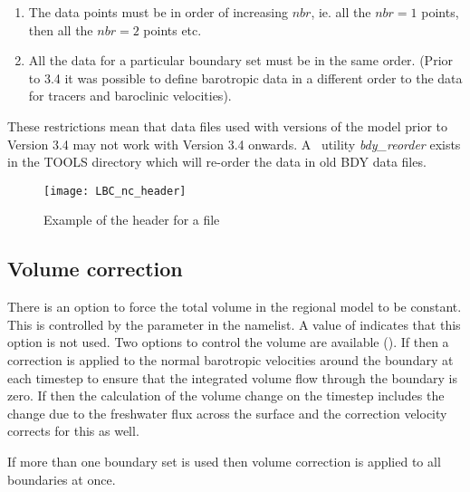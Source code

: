 \documentclass[../main/NEMO_manual]{subfiles}
\begin{document}
\begin{enumerate}
\item The data points must be in order of increasing $nbr$,
  ie. all the $nbr=1$ points, then all the $nbr=2$ points etc.
\item All the data for a particular boundary set must be in the same order.
  (Prior to 3.4 it was possible to define barotropic data in a different order to
  the data for tracers and baroclinic velocities).
\end{enumerate}

These restrictions mean that data files used with versions of the
model prior to Version 3.4 may not work with Version 3.4 onwards.
A \fortran\ utility {\itshape bdy\_reorder} exists in the TOOLS directory which
will re-order the data in old BDY data files.

\begin{figure}[!t]
  \centering
  \texttt{[image: LBC\_nc\_header]}
  \caption[Header for a \protect{} file]{
    Example of the header for a \protect{} file}
  \label{fig:LBC_nc_header}
\end{figure}

\subsection{Volume correction}
\label{subsec:LBC_bdy_vol_corr}

There is an option to force the total volume in the regional model to be constant.
This is controlled  by the  parameter in the namelist.
A value of  indicates that this option is not used.
Two options to control the volume are available ().
If  then a correction is applied to the normal barotropic velocities around the boundary at
each timestep to ensure that the integrated volume flow through the boundary is zero.
If  then the calculation of the volume change on
the timestep includes the change due to the freshwater flux across the surface and
the correction velocity corrects for this as well.

If more than one boundary set is used then volume correction is
applied to all boundaries at once.

\end{document}
